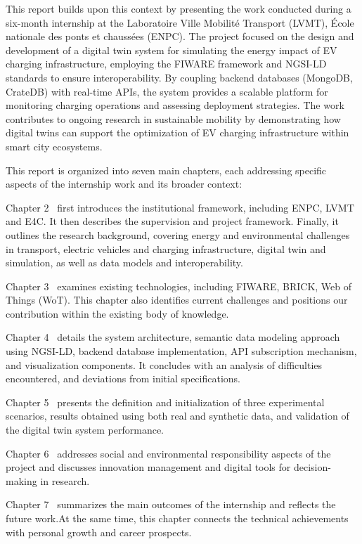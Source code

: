 This report builds upon this context by presenting the work conducted during 
a six-month internship at the Laboratoire Ville Mobilité Transport (LVMT), 
École nationale des ponts et chaussées (ENPC). The project focused on the 
design and development of a digital twin system for simulating the energy 
impact of EV charging infrastructure, employing the FIWARE framework and 
NGSI-LD standards to ensure interoperability. By coupling backend databases 
(MongoDB, CrateDB) with real-time APIs, the system provides a scalable 
platform for monitoring charging operations and assessing deployment 
strategies. The work contributes to ongoing research in sustainable mobility 
by demonstrating how digital twins can support the optimization of EV 
charging infrastructure within smart city ecosystems.

This report is organized into seven main chapters, each addressing specific aspects 
of the internship work and its broader context:

Chapter 2~\textbf{} first introduces the institutional framework, including ENPC, LVMT and E4C. It then describes the supervision and project framework. Finally, it outlines the research background, covering energy and environmental challenges in transport, electric vehicles and charging infrastructure, digital twin and simulation, as well as data models and interoperability.

Chapter 3~\textbf{} examines existing technologies, 
including FIWARE, BRICK, Web of Things (WoT). This chapter also identifies current challenges and positions our contribution within the 
existing body of knowledge.

Chapter 4~\textbf{} details the system architecture, semantic data modeling 
approach using NGSI-LD, backend database implementation, API subscription mechanism, and 
visualization components. It concludes with an analysis of difficulties 
encountered, and deviations from initial specifications.

Chapter 5~\textbf{} presents the definition and 
initialization of three experimental scenarios, results obtained using both real 
and synthetic data, and validation of the digital twin system performance.

Chapter 6~\textbf{} addresses social and environmental 
responsibility aspects of the project and discusses innovation management and digital 
tools for decision-making in research.

Chapter 7~\textbf{} summarizes the main outcomes of the internship and reflects the future work.At the same time, this chapter connects the technical achievements with personal growth and career prospects.  


